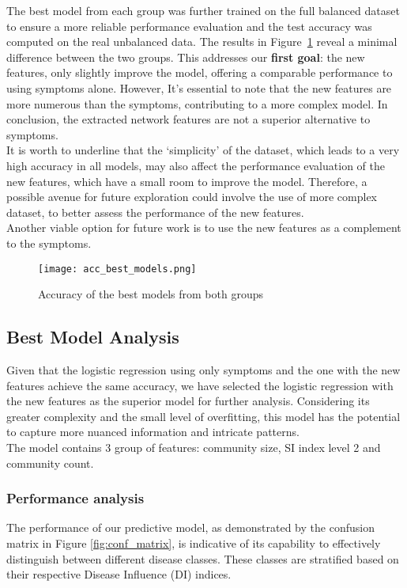 \noindent
The best model from each group was further trained on the full balanced dataset to ensure a more reliable
performance evaluation and the test accuracy was computed on the real unbalanced data.
The results in Figure~\ref{fig:acc_best_models} reveal a minimal difference between
the two groups. This addresses our \textbf{first goal}: the new features, only slightly improve the model,
offering a comparable performance to using symptoms alone. However, It's essential to note that the new features are
more numerous than the symptoms, contributing to a more complex model. In conclusion, the extracted network
features are not a superior alternative to symptoms.\\
It is worth to underline that the `simplicity' of the dataset, which leads to a very high accuracy in all models, may also affect the performance
evaluation of the new features, which have a small room to improve the model. Therefore, a possible avenue
for future exploration could involve the use of more complex dataset, to better assess the performance of the
new features.\\
Another viable option for future work is to use the new features as a complement to the symptoms.




\begin{figure}[h]
	\centering
	\texttt{[image: acc\_best\_models.png]}
	\caption{Accuracy of the best models from both groups}\label{fig:acc_best_models}
\end{figure}




\subsection{Best Model Analysis}
Given that the logistic regression using only symptoms and the one with the new features achieve the same accuracy,
we have selected the logistic regression with the new features as the superior model for further analysis.
Considering its greater complexity and the small level of overfitting,
this model has the potential to capture more nuanced information and intricate patterns.\\
The model contains 3 group of features: community size, SI index level 2 and community count.
\subsubsection*{Performance analysis}
The performance of our predictive model, as demonstrated by the confusion matrix in Figure \ref{fig:conf_matrix},
is indicative of its capability to effectively distinguish between different disease classes.
These classes are stratified based on their respective Disease Influence (DI) indices.

